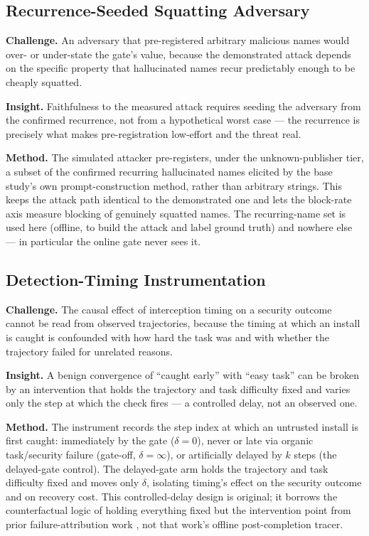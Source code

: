 \documentclass[11pt]{article}
\begin{document}
\subsection{Recurrence-Seeded Squatting Adversary}
\textbf{Challenge.} An adversary that pre-registered arbitrary malicious names would over- or under-state the gate's value, because the demonstrated attack depends on the specific property that hallucinated names recur predictably enough to be cheaply squatted.

\textbf{Insight.} Faithfulness to the measured attack requires seeding the adversary from the confirmed recurrence, not from a hypothetical worst case --- the recurrence is precisely what makes pre-registration low-effort and the threat real.

\textbf{Method.} The simulated attacker pre-registers, under the unknown-publisher tier, a subset of the confirmed recurring hallucinated names elicited by the base study's own prompt-construction method, rather than arbitrary strings. This keeps the attack path identical to the demonstrated one and lets the block-rate axis measure blocking of genuinely squatted names. The recurring-name set is used here (offline, to build the attack and label ground truth) and nowhere else --- in particular the online gate never sees it.

\subsection{Detection-Timing Instrumentation}
\textbf{Challenge.} The causal effect of interception timing on a security outcome cannot be read from observed trajectories, because the timing at which an install is caught is confounded with how hard the task was and with whether the trajectory failed for unrelated reasons.

\textbf{Insight.} A benign convergence of ``caught early'' with ``easy task'' can be broken by an intervention that holds the trajectory and task difficulty fixed and varies only the step at which the check fires --- a controlled delay, not an observed one.

\textbf{Method.} The instrument records the step index at which an untrusted install is first caught: immediately by the gate ($\delta = 0$), never or late via organic task/security failure (gate-off, $\delta = \infty$), or artificially delayed by $k$ steps (the delayed-gate control). The delayed-gate arm holds the trajectory and task difficulty fixed and moves only $\delta$, isolating timing's effect on the security outcome and on recovery cost. This controlled-delay design is original; it borrows the counterfactual logic of holding everything fixed but the intervention point from prior failure-attribution work \citep{agentracer}, not that work's offline post-completion tracer.
\end{document}
